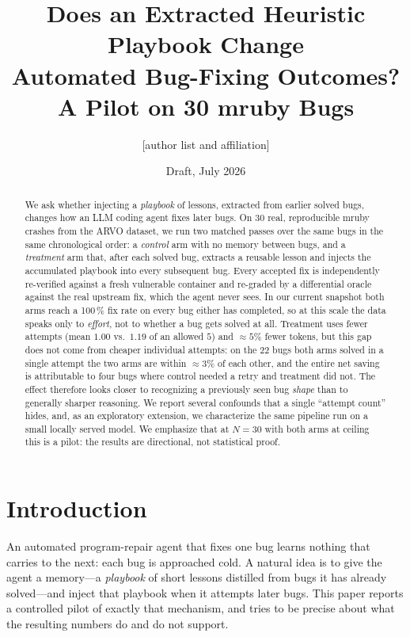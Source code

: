 \documentclass[11pt]{article}
\title{\textbf{Does an Extracted Heuristic Playbook Change\\Automated Bug-Fixing Outcomes? A Pilot on 30 mruby Bugs}}
\author{[author list and affiliation]}
\date{Draft, July 2026}
\begin{document}
\maketitle

\begin{abstract}
We ask whether injecting a \emph{playbook} of lessons, extracted from earlier
solved bugs, changes how an LLM coding agent fixes later bugs. On 30 real,
reproducible mruby crashes from the ARVO dataset, we run two matched passes over
the same bugs in the same chronological order: a \emph{control} arm with no memory
between bugs, and a \emph{treatment} arm that, after each solved bug, extracts a
reusable lesson and injects the accumulated playbook into every subsequent bug.
Every accepted fix is independently re-verified against a fresh vulnerable
container and re-graded by a differential oracle against the real upstream fix,
which the agent never sees. In our current snapshot both arms reach a
100\,\% fix rate on every bug either has completed, so at this scale the data
speaks only to \emph{effort}, not to whether a bug gets solved at all. Treatment
uses fewer attempts (mean $1.00$ vs.\ $1.19$ of an allowed $5$) and $\approx 5\%$
fewer tokens, but this gap does not come from cheaper individual attempts: on the
22 bugs both arms solved in a single attempt the two arms are within
$\approx 3\%$ of each other, and the entire net saving is attributable to four
bugs where control needed a retry and treatment did not. The effect therefore
looks closer to recognizing a previously seen bug \emph{shape} than to generally
sharper reasoning. We report several confounds that a single ``attempt count''
hides, and, as an exploratory extension, we characterize the same pipeline run on
a small locally served model. We emphasize that at $N=30$ with both arms at
ceiling this is a pilot: the results are directional, not statistical proof.
\end{abstract}

\section{Introduction}

An automated program-repair agent that fixes one bug learns nothing that carries
to the next: each bug is approached cold. A natural idea is to give the agent a
memory---a \emph{playbook} of short lessons distilled from bugs it has already
solved---and inject that playbook when it attempts later bugs. This paper reports
a controlled pilot of exactly that mechanism, and tries to be precise about what
the resulting numbers do and do not support.
\end{document}
